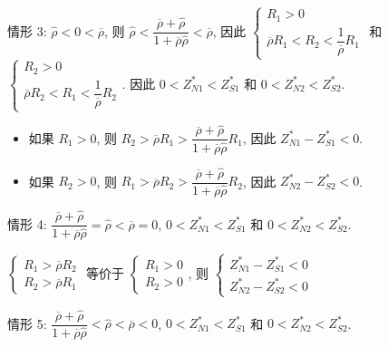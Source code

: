 \documentclass[10.0pt]{article}
\begin{document}
情形 3: $ {\hat \rho} < 0 < \overline{\rho} $, 则 $ {\hat \rho} < \dfrac{\overline{\rho} + {\hat \rho}}{1 + \overline{\rho} {\hat \rho}} < \overline{\rho} $, 因此 $ \left\{ \begin{matrix} R_1 > 0 \\ \overline{\rho} R_1 < R_2 < \dfrac{1}{\overline{\rho}} R_1 \end{matrix} \right. $ 和 $ \left\{ \begin{matrix} R_2 > 0 \\ \overline{\rho} R_2 < R_1 < \dfrac{1}{\overline{\rho}} R_2 \end{matrix} \right. $.
因此 $ 0 < Z_{N 1}^* < Z_{S 1}^* $ 和 $ 0 < Z_{N 2}^* < Z_{S 2}^* $.
\begin{itemize}
\item 如果 $ R_1 > 0 $, 则 $ R_2 > \overline{\rho} R_1 > \dfrac{\overline{\rho} + {\hat \rho}}{1 + \overline{\rho} {\hat \rho}} R_1 $, 因此 $ Z_{N 1}^* - Z_{S 1}^* < 0 $.
\item 如果 $ R_2 > 0 $, 则 $ R_1 > \overline{\rho} R_2 > \dfrac{\overline{\rho} + {\hat \rho}}{1 + \overline{\rho} {\hat \rho}} R_2 $, 因此 $ Z_{N 2}^* - Z_{S 2}^* < 0 $.
\end{itemize}

情形 4: $ \dfrac{\overline{\rho} + {\hat \rho}}{1 + \overline{\rho} {\hat \rho}} = {\hat \rho} < \overline{\rho} = 0 $, $ 0 < Z_{N 1}^* < Z_{S 1}^* $ 和 $ 0 < Z_{N 2}^* < Z_{S 2}^* $.

$ \left\{ \begin{matrix} R_1 > \overline{\rho} R_2 \\ R_2 > \overline{\rho} R_1 \end{matrix} \right. $ 等价于 $ \left\{ \begin{matrix} R_1 > 0 \\ R_2 > 0 \end{matrix} \right. $, 则 $ \left\{ \begin{matrix} Z_{N 1}^* - Z_{S 1}^* < 0 \\ Z_{N 2}^* - Z_{S 2}^* < 0 \end{matrix} \right. $

情形 5: $ \dfrac{\overline{\rho} + {\hat \rho}}{1 + \overline{\rho} {\hat \rho}} < {\hat \rho} < \overline{\rho} < 0 $, $ 0 < Z_{N 1}^* < Z_{S 1}^* $ 和 $ 0 < Z_{N 2}^* < Z_{S 2}^* $.
\end{document}

